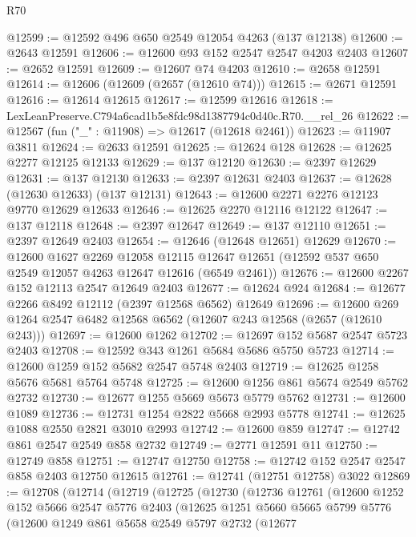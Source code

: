 \begin{lexlean}{R70}
\begin{coremodule}
@12599 := @12592 @496 @650 @2549 @12054 @4263 (@137 @12138)
@12600 := @2643 @12591
@12606 := @12600 @93 @152 @2547 @2547 @4203 @2403
@12607 := @2652 @12591
@12609 := @12607 @74 @4203
@12610 := @2658 @12591
@12614 := @12606 (@12609 (@2657 (@12610 @74)))
@12615 := @2671 @12591
@12616 := @12614 @12615
@12617 := @12599 @12616
@12618 := LexLeanPreserve.C794a6cad1b5e8fdc98d1387794c0d40c.R70.__rel_26
@12622 := @12567 (fun ("_" : @11908) => @12617 (@12618 @2461))
@12623 := @11907 @3811
@12624 := @2633 @12591
@12625 := @12624 @128
@12628 := @12625 @2277 @12125 @12133
@12629 := @137 @12120
@12630 := @2397 @12629
@12631 := @137 @12130
@12633 := @2397 @12631 @2403
@12637 := @12628 (@12630 @12633) (@137 @12131)
@12643 := @12600 @2271 @2276 @12123 @9770 @12629 @12633
@12646 := @12625 @2270 @12116 @12122
@12647 := @137 @12118
@12648 := @2397 @12647
@12649 := @137 @12110
@12651 := @2397 @12649 @2403
@12654 := @12646 (@12648 @12651) @12629
@12670 := @12600
    @1627
    @2269
    @12058
    @12115
    @12647
    @12651
    (@12592 @537 @650 @2549 @12057 @4263 @12647 @12616 (@6549 @2461))
@12676 := @12600 @2267 @152 @12113 @2547 @12649 @2403
@12677 := @12624 @924
@12684 := @12677 @2266 @8492 @12112 (@2397 @12568 @6562) @12649
@12696 := @12600 @269 @1264 @2547 @6482 @12568 @6562 (@12607 @243 @12568 (@2657 (@12610 @243)))
@12697 := @12600 @1262
@12702 := @12697 @152 @5687 @2547 @5723 @2403
@12708 := @12592 @343 @1261 @5684 @5686 @5750 @5723
@12714 := @12600 @1259 @152 @5682 @2547 @5748 @2403
@12719 := @12625 @1258 @5676 @5681 @5764 @5748
@12725 := @12600 @1256 @861 @5674 @2549 @5762 @2732
@12730 := @12677 @1255 @5669 @5673 @5779 @5762
@12731 := @12600 @1089
@12736 := @12731 @1254 @2822 @5668 @2993 @5778
@12741 := @12625 @1088 @2550 @2821 @3010 @2993
@12742 := @12600 @859
@12747 := @12742 @861 @2547 @2549 @858 @2732
@12749 := @2771 @12591 @11
@12750 := @12749 @858
@12751 := @12747 @12750
@12758 := @12742 @152 @2547 @2547 @858 @2403 @12750 @12615
@12761 := @12741 (@12751 @12758) @3022
@12869 := @12708
    (@12714
      (@12719
        (@12725
          (@12730
            (@12736
              @12761
              (@12600
                @1252
                @152
                @5666
                @2547
                @5776
                @2403
                (@12625
                  @1251
                  @5660
                  @5665
                  @5799
                  @5776
                  (@12600
                    @1249
                    @861
                    @5658
                    @2549
                    @5797
                    @2732
                    (@12677

\end{coremodule}
\end{lexlean}

